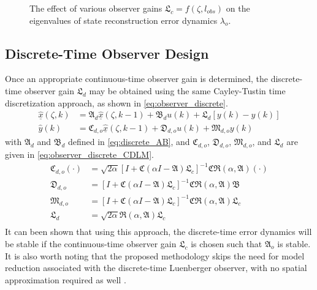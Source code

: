 \begin{figure}[!htbp]
    \centering
    
    \caption{The effect of various observer gains $\mathfrak{L}_c = f(\zeta, l_{obs})$ on the eigenvalues of state reconstruction error dynamics $\lambda_o$.}
    \label{fig:L_vs_lambda}
\end{figure}

\subsection{Discrete-Time Observer Design}
Once an appropriate continuous-time observer gain is determined, the discrete-time observer gain $\mathfrak{L}_d$ may be obtained using the same Cayley-Tustin time discretization approach, as shown in \eqref{eq:observer_discrete}.
\begin{equation} \label{eq:observer_discrete}
    \begin{aligned}
        \underline{\hat{x}}(\zeta, k) &= \mathfrak{A}_d \underline{\hat{x}}(\zeta, k-1) + \mathfrak{B}_d u(k) + \mathfrak{L}_d [y(k) - \hat{y}(k)] \\
        \hat{y}(k) &= \mathfrak{C}_{d,o} \underline{\hat{x}}(\zeta, k-1) + \mathfrak{D}_{d,o} u(k) + \mathfrak{M}_{d,o} y(k)
    \end{aligned}
\end{equation}
with $\mathfrak{A}_d$ and $\mathfrak{B}_d$ defined in \eqref{eq:discrete_AB}, and $\mathfrak{C}_{d,o}$, $\mathfrak{D}_{d,o}$, $\mathfrak{M}_{d,o}$, and $\mathfrak{L}_d$ are given in \eqref{eq:observer_discrete_CDLM}.
\begin{equation} \label{eq:observer_discrete_CDLM}
    \begin{aligned}
        \mathfrak{C}_{d,o} (\cdot) &= \sqrt{2\alpha} \left[ I + \mathfrak{C} (\alpha I - \mathfrak{A}) \mathfrak{L}_c \right]^{-1} \mathfrak{C} \mathfrak{R}(\alpha, \mathfrak{A}) (\cdot) \\
        \mathfrak{D}_{d,o} &= \left[ I + \mathfrak{C} (\alpha I - \mathfrak{A}) \mathfrak{L}_c \right]^{-1} \mathfrak{C} \mathfrak{R}(\alpha, \mathfrak{A}) \mathfrak{B} \\
        \mathfrak{M}_{d,o} &= \left[ I + \mathfrak{C} (\alpha I - \mathfrak{A}) \mathfrak{L}_c \right]^{-1} \mathfrak{C} \mathfrak{R}(\alpha, \mathfrak{A}) \mathfrak{L}_c \\
        \mathfrak{L}_d &= \sqrt{2\alpha} \mathfrak{R}(\alpha, \mathfrak{A}) \mathfrak{L}_c \\
    \end{aligned}
\end{equation}
It can been shown that using this approach, the discrete-time error dynamics will be stable if the continuous-time observer gain $\mathfrak{L}_c$ is chosen such that $\mathfrak{A}_o$ is stable. It is also worth noting that the proposed methodology skips the need for model reduction associated with the discrete-time Luenberger observer, with no spatial approximation required as well \cite{dochain2000state,dochain2001state,alonso2004optimal,ali2015review,khatibi2021model}.